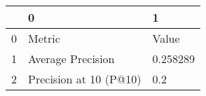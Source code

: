 \begin{tabular}{lll}
\toprule
{} &                       0 &         1 \\
\midrule
0 &                  Metric &     Value \\
1 &       Average Precision &  0.258289 \\
2 &  Precision at 10 (P@10) &       0.2 \\
\bottomrule
\end{tabular}
